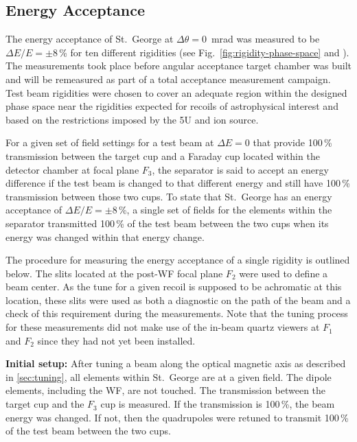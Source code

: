 \subsection{Energy Acceptance}

The energy acceptance of St.\ George at $\Delta\theta = 0$~mrad was
measured to be $\Delta E/E = \pm 8$\,\% for ten different rigidities
(see Fig.~\ref{fig:rigidity-phase-space} and \cite{Meisel2017}). The
measurements took place before angular acceptance target chamber was
built and will be remeasured as part of a total acceptance measurement
campaign. Test beam rigidities were chosen to cover an adequate region
within the designed phase space near the rigidities expected for recoils
of astrophysical interest and based on the restrictions imposed by the
5U and ion source.

For a given set of field settings for a test beam at $\Delta E = 0$ that
provide 100\,\% transmission between the target cup and a Faraday cup
located within the detector chamber at focal plane $F_3$, the separator
is said to accept an energy difference if the test beam is changed to
that different energy and still have 100\,\% transmission between those
two cups. To state that St.\ George has an energy acceptance of $\Delta
E/E = \pm 8$\,\%, a single set of fields for the elements within the
separator transmitted 100\,\% of the test beam between the two cups when
its energy was changed within that energy change.

The procedure for measuring the energy acceptance of a single rigidity
is outlined below. The slits located at the post-WF focal plane $F_2$
were used to define a beam center. As the tune for a given recoil is
supposed to be achromatic at this location, these slits were used as
both a diagnostic on the path of the beam and a check of this
requirement during the measurements. Note that the tuning process for
these measurements did not make use of the in-beam quartz viewers at
$F_1$ and $F_2$ since they had not yet been installed.

\textbf{Initial setup:}
After tuning a beam along the optical magnetic axis as described in
\ref{sec:tuning}, all elements within St.\ George are at a given field.
The dipole elements, including the WF, are not touched. The transmission
between the target cup and the $F_3$ cup is measured. If the
transmission is 100\,\%, the beam energy was changed. If not, then the
quadrupoles were retuned to transmit 100\,\% of the test beam between
the two cups.

